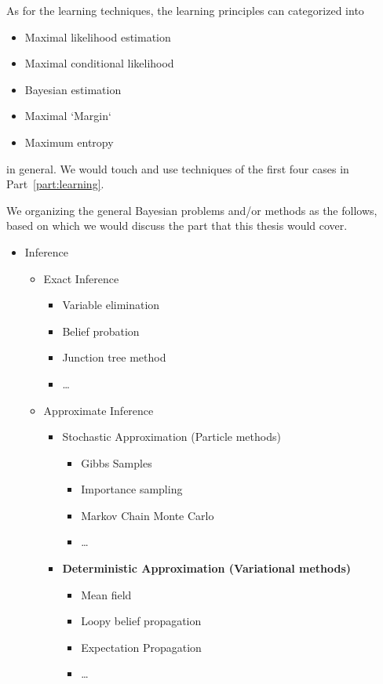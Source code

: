 As for the learning techniques, the learning principles can categorized into
\begin{itemize}
\item Maximal likelihood estimation
\item Maximal conditional likelihood
\item Bayesian estimation
\item Maximal `Margin`
\item Maximum entropy
\end{itemize}
in general. We would touch and use techniques of the first four cases in Part~\ref{part:learning}.


We organizing the general Bayesian problems and/or methods as the follows, based on which we would discuss the part that this thesis would cover.

\begin{itemize}
\item Inference
  \begin{itemize}
  \item Exact Inference
    \begin{itemize}
    \item Variable elimination
    \item Belief probation
    \item Junction tree method
    \item \ldots
    \end{itemize}
    
  \item Approximate Inference
    \begin{itemize}
    \item Stochastic Approximation (Particle methods)
      \begin{itemize}
      \item Gibbs Samples
      \item Importance sampling
      \item Markov Chain Monte Carlo
      \item \ldots
      \end{itemize}
      
    \item \textbf{Deterministic Approximation (Variational methods)}
      \begin{itemize}
      \item Mean field
      \item Loopy belief propagation
      \item Expectation Propagation
      \item \ldots
      \end{itemize}
    \end{itemize}
  \end{itemize}
  

\end{itemize}
